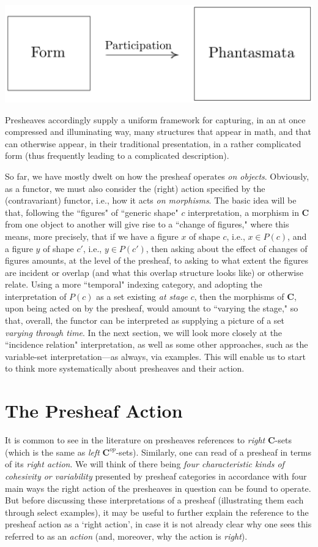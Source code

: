 \documentclass[a4paper]{book}
\theoremstyle{definition}
\theoremstyle{definition}
\theoremstyle{definition}
\theoremstyle{theorem}
\theoremstyle{definition}
\begin{document}
\begin{center}
	\includegraphics*[scale=0.23]{FormParticipation.png}
\end{center}
Presheaves accordingly supply a uniform framework for capturing, in an at once compressed and illuminating way, many structures that appear in math, and that can otherwise appear, in their traditional presentation, in a rather complicated form (thus frequently leading to a complicated description). \par   
So far, we have mostly dwelt on how the presheaf operates \textit{on objects}. Obviously, as a functor, we must also consider the (right) action specified by the (contravariant) functor, i.e., how it acts \textit{on morphisms}. The basic idea will be that, following the ``figures" of ``generic shape" $c$ interpretation, a morphism in \textbf{C} from one object to another will give rise to a ``change of figures," where this means, more precisely, that if we have a figure $x$ of shape $c$, i.e., $x \in P(c)$, and a figure $y$ of shape $c'$, i.e., $y \in P(c')$, then asking about the effect of changes of figures amounts, at the level of the presheaf, to asking to what extent the figures are incident or overlap (and what this overlap structure looks like) or otherwise relate. Using a more ``temporal" indexing category, and adopting the interpretation of $P(c)$ as a set existing \textit{at stage} $c$, then the morphisms of \textbf{C}, upon being acted on by the presheaf, would amount to ``varying the stage," so that, overall, the functor can be interpreted as supplying a picture of a set \textit{varying through time}. In the next section, we will look more closely at the ``incidence relation" interpretation, as well as some other approaches, such as the variable-set interpretation---as always, via examples. This will enable us to start to think more systematically about presheaves and their action.
\section{The Presheaf Action}
It is common to see in the literature on presheaves references to \textit{right} \textbf{C}-sets (which is the same as \textit{left} $\textbf{C}^{op}$-sets). Similarly, one can read of a presheaf in terms of its \textit{right action}. We will think of there being \textit{four characteristic kinds of cohesivity or variability} presented by presheaf categories in accordance with four main ways the right action of the presheaves in question can be found to operate. But before discussing these interpretations of a presheaf (illustrating them each through select examples), it may be useful to further explain the reference to the presheaf action as a `right action', in case it is not already clear why one sees this referred to as an \textit{action} (and, moreover, why the action is \textit{right}). 
\end{document}
